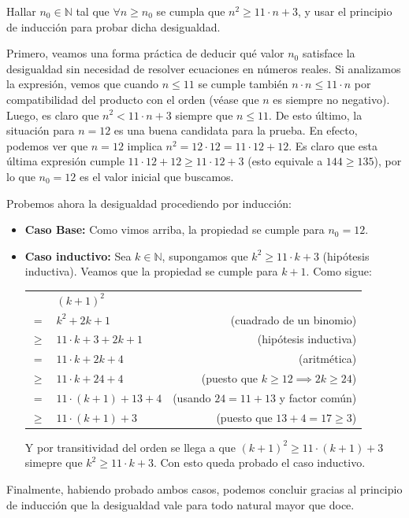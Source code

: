 \begin{problem}{}{}

    Hallar $n_0 \in \mathbb{N}$ tal que $\forall n \ge n_0$ se cumpla que
    $n^2 \ge 11 \cdot n + 3$, y usar el principio de inducción para probar dicha desigualdad.

\end{problem}
\vspace{1ex}

Primero, veamos una forma práctica de deducir qué valor $n_0$ satisface la desigualdad sin necesidad de resolver ecuaciones en números reales.
Si analizamos la expresión, vemos que cuando $n \le 11$ se cumple también $n \cdot n \le 11 \cdot n$ por compatibilidad del producto con el orden (véase que $n$ es siempre no negativo).
Luego, es claro que $n^2 < 11 \cdot n + 3$ siempre que $n \le 11$.
De esto último, la situación para $n=12$ es una buena candidata para la prueba.
En efecto, podemos ver que $n=12$ implica $n^2 = 12 \cdot 12 = 11 \cdot 12 + 12$.
Es claro que esta última expresión cumple $11 \cdot 12 + 12 \ge 11 \cdot 12 + 3$ (esto equivale a $144 \ge 135$), por lo que $n_0 = 12$ es el valor inicial que buscamos.

Probemos ahora la desigualdad procediendo por inducción:

\begin{itemize}
    \item \textbf{Caso Base:} Como vimos arriba, la propiedad se cumple para $n_0 = 12$.
    
    \item \textbf{Caso inductivo:} Sea $k \in \mathbb{N}$, supongamos que $k^2 \ge 11 \cdot k + 3$ (hipótesis inductiva).
          Veamos que la propiedad se cumple para $k + 1$. Como sigue:

          \begin{tabular}{|l l r}
             & ${(k+1)}^2$ & \\
            $=$ & $k^2 + 2k + 1$ & (cuadrado de un binomio) \\
            $\ge$ & $11 \cdot k + 3 + 2k + 1$ & (hipótesis inductiva) \\
            $=$ & $11 \cdot k + 2k + 4$ & (aritmética) \\
            $\ge$ & $11 \cdot k + 24 + 4$ & (puesto que $k \ge 12 \implies 2k \ge 24$) \\
            $=$ & $11 \cdot (k+1) + 13 + 4$ & (usando $24 = 11 + 13$ y factor común) \\
            $\ge$ & $11 \cdot (k+1) + 3$ & (puesto que $13 + 4 = 17 \ge 3$) \\
          \end{tabular}

          Y por transitividad del orden se llega a que ${(k+1)}^2 \ge 11 \cdot (k+1) + 3$ simepre que $k^2 \ge 11 \cdot k + 3$.
          Con esto queda probado el caso inductivo.
\end{itemize}

Finalmente, habiendo probado ambos casos, podemos concluir gracias al principio de inducción que la desigualdad vale para todo natural mayor que doce.
